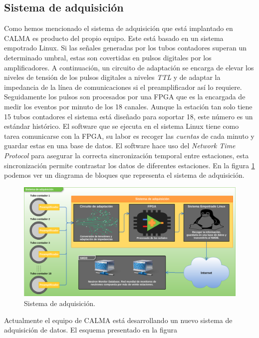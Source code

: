 	\subsection{Sistema de adquisición}
		Como hemos mencionado el sistema de adquisición que está implantado en CALMA es producto del propio equipo\cite{Garcia2014}. Este está
		basado en un sistema empotrado Linux. Si las señales generadas por los tubos contadores superan un determinado umbral, estas son
		covertidas en pulsos digitales por los amplificadores. A continuación, un circuito de adaptación se encarga de elevar los niveles de
		tensión de los pulsos digitales a niveles \emph{TTL} y de adaptar la impedancia de la línea de comunicaciones si el preamplificador
		así lo requiere. Seguidamente los pulsos son procesados por una FPGA que es la encargada de medir los eventos por minuto de los 18
		canales. Aunque la estación tan solo tiene 15 tubos contadores el sistema está diseñado para soportar 18, este número es un estándar
		histórico. El software que se ejecuta en el sistema Linux tiene como tarea comunicarse con la FPGA, su labor es recoger las
		\emph{cuentas} de cada minuto y guardar estas en una base de datos. El software hace uso del \emph{Network Time Protocol} para
		asegurar la correcta sincronización temporal entre estaciones, esta sincronización permite contrastar los datos de diferentes
		estaciones. En la figura \ref{fig:acqsis} podemos ver un diagrama de bloques que representa el sistema de adquisición.
		\begin{figure}[h]
			\centering
			\includegraphics[keepaspectratio, width=1\textwidth]{./img/AcqSis.png}
			\caption{Sistema de adquisición.}
			\label{fig:acqsis}
		\end{figure}
		\par
		Actualmente el equipo de CALMA está desarrollando un nuevo sistema de adquisición de datos. El esquema presentado en la figura
